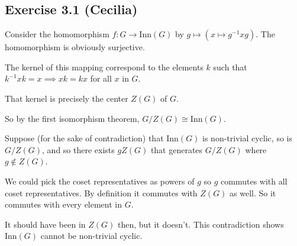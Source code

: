 \subsection*{Exercise 3.1 (Cecilia)}
Consider the homomorphism $ f: G \to \text{Inn}(G) $ by $ g \mapsto (x \mapsto g^{-1}xg) $. The homomorphism is obviously surjective.

The kernel of this mapping correspond to the elements $k$ such that $ k^{-1}xk = x \implies xk = kx $ for all $ x $ in $ G $.

That kernel is precisely the center $Z(G)$ of $G$.

So by the first isomorphism theorem, $ G/Z(G) \cong \text{Inn}(G) $.

Suppose (for the sake of contradiction) that $\text{Inn}(G) $ is non-trivial cyclic, so is $ G/Z(G) $, and so there exists $ gZ(G) $ that generates $ G/Z(G) $ where $ g \notin Z(G) $.

We could pick the coset representatives as powers of $g$ so $g$ commutes with all coset representatives. By definition it commutes with $Z(G)$ as well. So it commutes with every element in $G$.

It should have been in $Z(G)$ then, but it doesn't. This contradiction shows $\text{Inn}(G) $ cannot be non-trivial cyclic.




